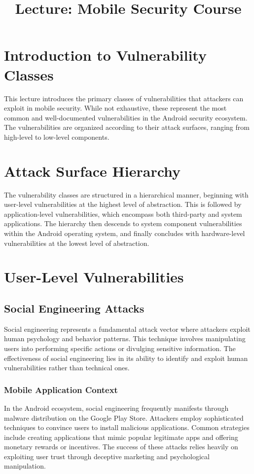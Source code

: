 \documentclass{article}
\title{Lecture: Mobile Security Course}
\author{}
\date{}
\begin{document}
\maketitle

\section{Introduction to Vulnerability Classes}
This lecture introduces the primary classes of vulnerabilities that attackers can exploit in mobile security. While not exhaustive, these represent the most common and well-documented vulnerabilities in the Android security ecosystem. The vulnerabilities are organized according to their attack surfaces, ranging from high-level to low-level components.

\section{Attack Surface Hierarchy}
The vulnerability classes are structured in a hierarchical manner, beginning with user-level vulnerabilities at the highest level of abstraction. This is followed by application-level vulnerabilities, which encompass both third-party and system applications. The hierarchy then descends to system component vulnerabilities within the Android operating system, and finally concludes with hardware-level vulnerabilities at the lowest level of abstraction.

\section{User-Level Vulnerabilities}
\subsection{Social Engineering Attacks}
Social engineering represents a fundamental attack vector where attackers exploit human psychology and behavior patterns. This technique involves manipulating users into performing specific actions or divulging sensitive information. The effectiveness of social engineering lies in its ability to identify and exploit human vulnerabilities rather than technical ones.

\subsubsection{Mobile Application Context}
In the Android ecosystem, social engineering frequently manifests through malware distribution on the Google Play Store. Attackers employ sophisticated techniques to convince users to install malicious applications. Common strategies include creating applications that mimic popular legitimate apps and offering monetary rewards or incentives. The success of these attacks relies heavily on exploiting user trust through deceptive marketing and psychological manipulation.
\end{document}
